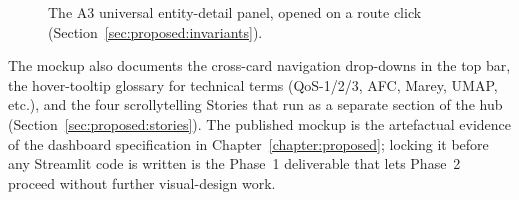 \begin{figure}[H]
\centering
{}
\caption{The A3 universal entity-detail panel, opened on a
route click (Section~\ref{sec:proposed:invariants}).}
\label{fig:prototype:panel}
\end{figure}

The mockup also documents the cross-card navigation drop-downs
in the top bar, the hover-tooltip glossary for technical terms
(QoS-1/2/3, AFC, Marey, UMAP, etc.), and the four scrollytelling
Stories that run as a separate section of the hub
(Section~\ref{sec:proposed:stories}). The published mockup is
the artefactual evidence of the dashboard specification in
Chapter~\ref{chapter:proposed}; locking it before any Streamlit
code is written is the Phase~1 deliverable that lets Phase~2
proceed without further visual-design work.
